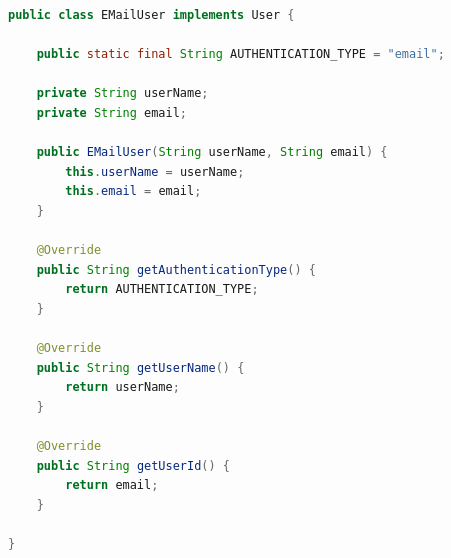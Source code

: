 \begin{lstlisting}[language=Java, frame=tlbr, caption=Ejemplo de una clase usuario propia.]	
public class EMailUser implements User {

    public static final String AUTHENTICATION_TYPE = "email";

    private String userName;
    private String email;

    public EMailUser(String userName, String email) {
        this.userName = userName;
        this.email = email;
    }

    @Override
    public String getAuthenticationType() {
        return AUTHENTICATION_TYPE;
    }

    @Override
    public String getUserName() {
        return userName;
    }

    @Override
    public String getUserId() {
        return email;
    }

}
\end{lstlisting}

